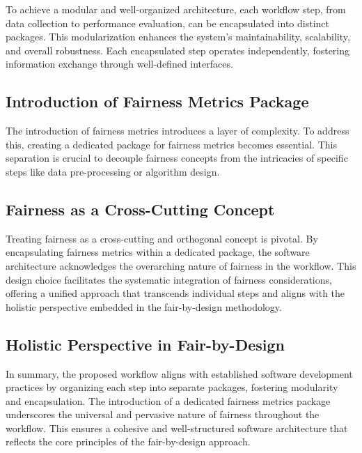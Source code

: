 \documentclass[12pt,a4paper,openright,twoside]{book}
\begin{document}
To achieve a modular and well-organized architecture, each workflow step, from data collection to performance evaluation, can be encapsulated into distinct packages. This modularization enhances the system's maintainability, scalability, and overall robustness. Each encapsulated step operates independently, fostering information exchange through well-defined interfaces.

\subsection{Introduction of Fairness Metrics Package}

The introduction of fairness metrics introduces a layer of complexity. To address this, creating a dedicated package for fairness metrics becomes essential. This separation is crucial to decouple fairness concepts from the intricacies of specific steps like data pre-processing or algorithm design.

\subsection{Fairness as a Cross-Cutting Concept}

Treating fairness as a cross-cutting and orthogonal concept is pivotal. By encapsulating fairness metrics within a dedicated package, the software architecture acknowledges the overarching nature of fairness in the workflow. This design choice facilitates the systematic integration of fairness considerations, offering a unified approach that transcends individual steps and aligns with the holistic perspective embedded in the fair-by-design methodology.

\subsection{Holistic Perspective in Fair-by-Design}

In summary, the proposed workflow aligns with established software development practices by organizing each step into separate packages, fostering modularity and encapsulation. The introduction of a dedicated fairness metrics package underscores the universal and pervasive nature of fairness throughout the workflow. This ensures a cohesive and well-structured software architecture that reflects the core principles of the fair-by-design approach.

\end{document}
